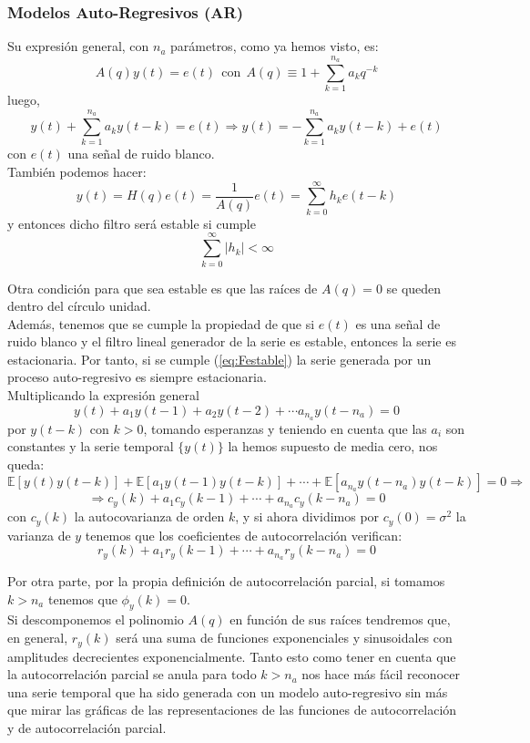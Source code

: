\subsubsection{Modelos Auto-Regresivos (AR)}

Su expresión general, con $n_a$ parámetros, como ya hemos visto, es:
\[	A(q)y(t) = e(t) \ \ \text{con} \ \ A(q) \equiv 1 + \sum_{k=1}^{n_a} a_k q^{-k}	\]
luego,
\[ y(t) + \sum_{k=1}^{n_a} a_k y(t-k) = e(t) \Rightarrow y(t) = - \sum_{k=1}^{n_a} a_k y(t-k) + e(t)	\]
con $e(t)$ una señal de ruido blanco.\\

También podemos hacer:
\[	y(t) = H(q) e(t) = \frac{1}{A(q)}e(t) = \sum_{k=0}^{\infty} h_k e(t-k)	\]
y entonces dicho filtro será estable si cumple 
\begin{equation} \label{eq:Festable}
\sum_{k=0}^{\infty} |h_k| < \infty
\end{equation}

Otra condición para que sea estable es que las raíces de $A(q) = 0$ se queden dentro del círculo unidad.\\

Además, tenemos que se cumple la propiedad de que si $e(t)$ es una señal de ruido blanco y el filtro lineal generador de la serie es estable, entonces la serie es estacionaria. Por tanto, si se cumple (\ref{eq:Festable}) la serie generada por un proceso auto-regresivo es siempre estacionaria.\\

Multiplicando la expresión general
\[	y(t) + a_1y(t-1) + a_2 y(t-2) + \cdots a_{n_a} y(t - n_a) = 0 \]
por $y(t-k)$ con $k>0$, tomando esperanzas y teniendo en cuenta que las $a_i$ son constantes y la serie temporal $\{y(t)\}$ la hemos supuesto de media cero, nos queda:
\[	\mathbb{E}[y(t)y(t-k)] + \mathbb{E}[a_1y(t-1)y(t-k)] + \cdots + \mathbb{E}[a_{n_a}y(t-n_a) y(t-k)] = 0 \Rightarrow	\]
\[	\Rightarrow c_y(k) + a_1 c_y(k-1) + \cdots + a_{n_a} c_y(k-n_a) = 0	\]
con $c_y(k)$ la autocovarianza de orden $k$, y si ahora dividimos por $c_y(0) = \sigma^2$ la varianza de $y$ tenemos que los coeficientes de autocorrelación verifican:
\[	r_y(k) + a_1r_y(k-1) + \cdots + a_{n_a} r_y(k-n_a) = 0	\]

Por otra parte, por la propia definición de autocorrelación parcial, si tomamos $k>n_a$ tenemos que $\phi_y(k) = 0$.\\

Si descomponemos el polinomio $A(q)$ en función de sus raíces tendremos que, en general, $r_y(k)$ será una suma de funciones exponenciales y sinusoidales con amplitudes decrecientes exponencialmente. Tanto esto como tener en cuenta que la autocorrelación parcial se anula para todo $k>n_a$ nos hace más fácil reconocer una serie temporal que ha sido generada con un modelo auto-regresivo sin más que mirar las gráficas de las representaciones de las funciones de autocorrelación y de autocorrelación parcial.\\

